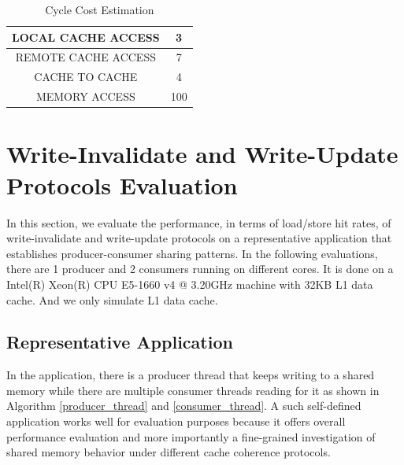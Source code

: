 \documentclass[conference]{IEEEtran}
\begin{document}

\begin{table}[!h]
\renewcommand{\arraystretch}{1.3}
\caption{Cycle Cost Estimation}
\label{cost_estimation}
\centering
\begin{tabular}{|c|c|}
\hline
LOCAL CACHE ACCESS & 3\\
\hline
REMOTE CACHE ACCESS & 7\\
\hline
CACHE TO CACHE & 4\\
\hline
MEMORY ACCESS & 100\\
\hline
\end{tabular}
\end{table}
\FloatBarrier

\newpage


\section{Write-Invalidate and Write-Update Protocols Evaluation}
In this section, we evaluate the performance, in terms of load/store hit rates, of write-invalidate and write-update protocols on a representative application that establishes producer-consumer sharing patterns. In the following evaluations, there are 1 producer and 2 consumers running on different cores. It is done on a Intel(R) Xeon(R) CPU E5-1660 v4 @ 3.20GHz machine with 32KB L1 data cache. And we only simulate L1 data cache.

\subsection{Representative Application}
In the application, there is a producer thread that keeps writing to a shared memory while there are multiple consumer threads reading for it as shown in Algorithm \ref{producer_thread} and \ref{consumer_thread}. A such self-defined application works well for evaluation purposes because it offers overall performance evaluation and more importantly a fine-grained investigation of shared memory behavior under different cache coherence protocols.
\end{document}
